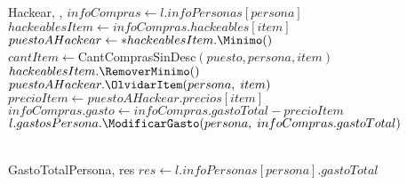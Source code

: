 \documentclass[../main.tex]{subfiles}
\begin{document}
\begin{algoritmos}
{    \begin{implementacion}{Hackear}{, , }{}{}
    \State $infoCompras \gets l.infoPersonas[persona]$                                                              %
    \State $hackeablesItem \gets infoCompras.hackeables[item]$                                                      %
    \State $puestoAHackear \gets *hackeablesItem.\Minimo()$  %
    \\
    \State $cantItem \gets $CantComprasSinDesc$(puesto, persona, item)$ 
      
        \State $hackeablesItem.\RemoverMinimo()$                                                         %
    \EndIf
    \State $puestoAHackear.\OlvidarItem(persona,\;item)$                                                            %
    \\
    \State $precioItem \gets puestoAHackear.precios[item]$                                                          %
    \State $infoCompras.gasto \gets infoCompras.gastoTotal - precioItem$                                            %
    \State $l.gastosPersona.\ModificarGasto(persona,\;infoCompras.gastoTotal)$                                      %
    \\
    
     \\
    \end{implementacion}
    
    \begin{implementacion}{GastoTotalPersona}{, }{res}{\dinero}
    \State $res \gets l.infoPersonas[persona].gastoTotal$ 
    

\end{implementacion}}
\end{algoritmos}
\end{document}
